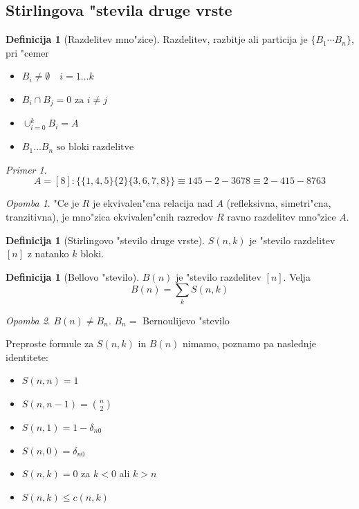 \documentclass[a4paper,12pt]{article}
\theoremstyle{definition}
\newtheorem{defn}[counter]{Definicija}
\theoremstyle{remark}
\newtheorem*{ex}{Primer}
\newtheorem*{rem}{Opomba}
\begin{document}
\subsection{Stirlingova "stevila druge vrste}
\begin{defn}[Razdelitev mno"zice]
    Razdelitev, razbitje ali particija je $\{B_1 \cdots B_n\}$, pri "cemer
    \begin{itemize}
        \item $B_i \neq \emptyset \quad i = 1 \ldots k$
        \item $B_i \cap B_j = 0 \text{ za } i \neq j$
        \item $\cup_{i=0}^k B_i = A$
        \item $B_1 \dots B_n \text{ so bloki razdelitve}$
    \end{itemize}
\end{defn}

\begin{ex}
	\[A = [8]: \{ \{1, 4, 5\} \{2\} \{3, 6, 7, 8\}\} \equiv 145-2-3678 \equiv 2-415-8763\]
\end{ex}
\begin{rem}
	"Ce je $R$ je ekvivalen"cna relacija nad $A$ (refleksivna, simetri"cna, tranzitivna), je mno"zica ekvivalen"cnih razredov $R$ ravno razdelitev mno"zice $A$.
\end{rem}

\begin{defn}[Stirlingovo "stevilo druge vrste]
    $S(n,k)$ je "stevilo razdelitev $[n]$ z natanko $k$ bloki.
\end{defn}
\begin{defn}[Bellovo "stevilo]
	$B(n)$ je "stevilo razdelitev $[n]$. Velja
	\[B(n) = \sum_k S(n,k)\]
\end{defn}

\begin{rem}
	$B(n) \neq B_n$. $B_n =$ Bernoulijevo "stevilo
\end{rem}

Preproste formule za $S(n,k)$ in $B(n)$ nimamo, poznamo pa naslednje identitete:
\begin{itemize}
	\item $S(n,n) = 1$
	\item $S(n,n-1) = \binom{n}{2}$
	\item $S(n,1) = 1 - \delta_{n0}$
	\item $S(n,0) = \delta_{n0}$
	\item $S(n,k) = 0$ za $k < 0$ ali $k > n$
	\item $S(n,k) \leq c(n,k)$
\end{itemize}
\end{document}
